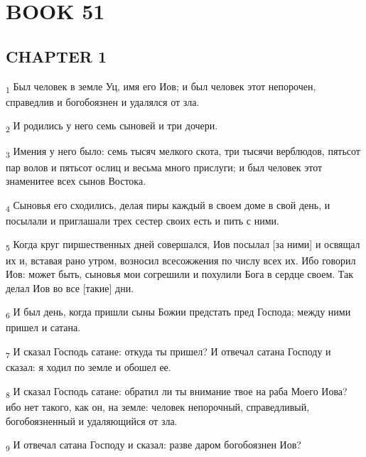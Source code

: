 \section{BOOK 51}
\subsection{CHAPTER 1}
\begin{tcolorbox}
\textsubscript{1} Был человек в земле Уц, имя его Иов; и был человек этот непорочен, справедлив и богобоязнен и удалялся от зла.
\end{tcolorbox}
\begin{tcolorbox}
\textsubscript{2} И родились у него семь сыновей и три дочери.
\end{tcolorbox}
\begin{tcolorbox}
\textsubscript{3} Имения у него было: семь тысяч мелкого скота, три тысячи верблюдов, пятьсот пар волов и пятьсот ослиц и весьма много прислуги; и был человек этот знаменитее всех сынов Востока.
\end{tcolorbox}
\begin{tcolorbox}
\textsubscript{4} Сыновья его сходились, делая пиры каждый в своем доме в свой день, и посылали и приглашали трех сестер своих есть и пить с ними.
\end{tcolorbox}
\begin{tcolorbox}
\textsubscript{5} Когда круг пиршественных дней совершался, Иов посылал [за ними] и освящал их и, вставая рано утром, возносил всесожжения по числу всех их. Ибо говорил Иов: может быть, сыновья мои согрешили и похулили Бога в сердце своем. Так делал Иов во все [такие] дни.
\end{tcolorbox}
\begin{tcolorbox}
\textsubscript{6} И был день, когда пришли сыны Божии предстать пред Господа; между ними пришел и сатана.
\end{tcolorbox}
\begin{tcolorbox}
\textsubscript{7} И сказал Господь сатане: откуда ты пришел? И отвечал сатана Господу и сказал: я ходил по земле и обошел ее.
\end{tcolorbox}
\begin{tcolorbox}
\textsubscript{8} И сказал Господь сатане: обратил ли ты внимание твое на раба Моего Иова? ибо нет такого, как он, на земле: человек непорочный, справедливый, богобоязненный и удаляющийся от зла.
\end{tcolorbox}
\begin{tcolorbox}
\textsubscript{9} И отвечал сатана Господу и сказал: разве даром богобоязнен Иов?
\end{tcolorbox}
